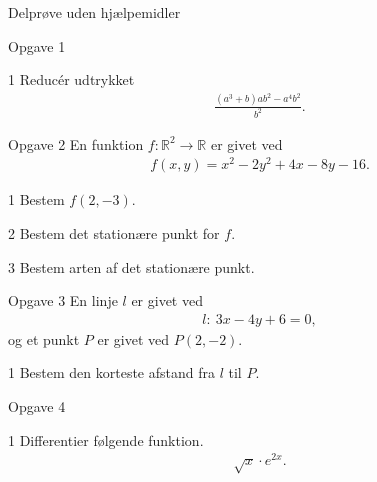 \begin{center}
\LARGE
Delprøve uden hjælpemidler 
\end{center}

\begin{opgavetekst}{Opgave 1}
\end{opgavetekst}
	\begin{delopgave}{}{1}
		Reducér udtrykket 
		\begin{align*}
			 \frac{(a^3+b)ab^2-a^4b^2}{b^2}.
		\end{align*}
	\end{delopgave}
\begin{opgavetekst}{Opgave 2}
	En funktion $f:\mathbb{R}^2 \to \mathbb{R}$ er givet ved
	\begin{align*}
		f(x,y) = x^2-2y^2+4x-8y-16.
	\end{align*}
\end{opgavetekst}
	\begin{delopgave}{}{1}
		Bestem $f(2,-3)$.
	\end{delopgave}
	\begin{delopgave}{}{2}
		Bestem det stationære punkt for $f$. 
	\end{delopgave}
	\begin{delopgave}{}{3}
		Bestem arten af det stationære punkt. 
	\end{delopgave}
\begin{opgavetekst}{Opgave 3}
	En linje $l$ er givet ved
	\begin{align*}
		l: \ 3x -4y + 6 = 0,
	\end{align*}
	og et punkt $P$ er givet ved $P(2,-2)$.
\end{opgavetekst}
\begin{delopgave}{}{1}
	Bestem den korteste afstand fra $l$ til $P$. 
\end{delopgave}
\begin{opgavetekst}{Opgave 4}
\end{opgavetekst}
\begin{delopgave}{}{1}
	Differentier følgende funktion.
	\begin{align*}
		\sqrt{x}\cdot e^{2x}.
	\end{align*}
\end{delopgave}
